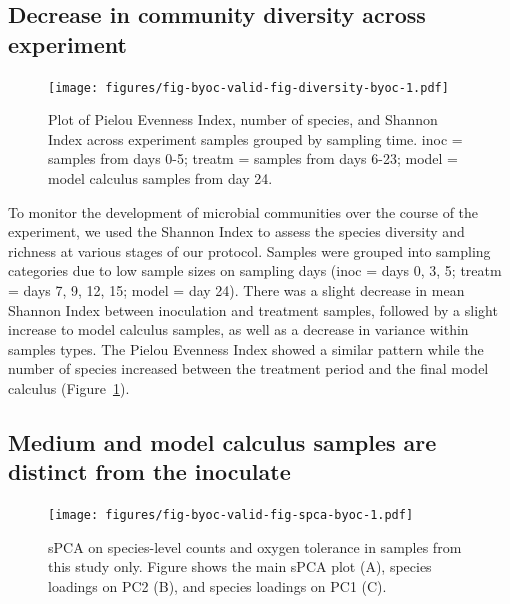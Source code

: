 \documentclass[
  letterpaper,
]{book}
\begin{document}
\hypertarget{decrease-in-community-diversity-across-experiment}{%
\subsection{Decrease in community diversity across
experiment}\label{decrease-in-community-diversity-across-experiment}}

\begin{figure}

{\centering \texttt{[image: figures/fig-byoc-valid-fig-diversity-byoc-1.pdf]}

}

\caption{\label{fig-diversity-byoc}Plot of Pielou Evenness Index, number
of species, and Shannon Index across experiment samples grouped by
sampling time. inoc = samples from days 0-5; treatm = samples from days
6-23; model = model calculus samples from day 24.}

\end{figure}

To monitor the development of microbial communities over the course of
the experiment, we used the Shannon Index to assess the species
diversity and richness at various stages of our protocol. Samples were
grouped into sampling categories due to low sample sizes on sampling
days (inoc = days 0, 3, 5; treatm = days 7, 9, 12, 15; model = day 24).
There was a slight decrease in mean Shannon Index between inoculation
and treatment samples, followed by a slight increase to model calculus
samples, as well as a decrease in variance within samples types. The
Pielou Evenness Index showed a similar pattern while the number of
species increased between the treatment period and the final model
calculus (Figure~\ref{fig-diversity-byoc}).

\hypertarget{medium-and-model-calculus-samples-are-distinct-from-the-inoculate}{%
\subsection{Medium and model calculus samples are distinct from the
inoculate}\label{medium-and-model-calculus-samples-are-distinct-from-the-inoculate}}

\begin{figure}

{\centering \texttt{[image: figures/fig-byoc-valid-fig-spca-byoc-1.pdf]}

}

\caption{\label{fig-spca-byoc}sPCA on species-level counts and oxygen
tolerance in samples from this study only. Figure shows the main sPCA
plot (A), species loadings on PC2 (B), and species loadings on PC1 (C).}

\end{figure}
\end{document}
